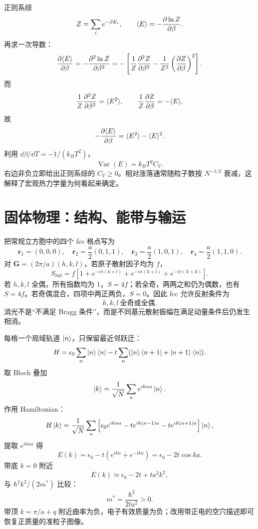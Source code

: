 \begin{examplebox}[title=例 12：由能量涨落推出正则系综热容]
正则系综
\[
Z=\sum_i e^{-\beta E_i},\qquad
\langle E\rangle=-\frac{\partial \ln Z}{\partial \beta}.
\]
再求一次导数：
\[
\frac{\partial \langle E\rangle}{\partial \beta}
=-\frac{\partial^2\ln Z}{\partial\beta^2}
=-\left[
\frac1Z\frac{\partial^2 Z}{\partial\beta^2}
-\frac1{Z^2}\left(\frac{\partial Z}{\partial \beta}\right)^2
\right].
\]
而
\[
\frac1Z\frac{\partial^2 Z}{\partial\beta^2}=\langle E^2\rangle,\qquad
\frac1Z\frac{\partial Z}{\partial \beta}=-\langle E\rangle,
\]
故
\[
-\frac{\partial \langle E\rangle}{\partial \beta}
=\langle E^2\rangle-\langle E\rangle^2.
\]
利用 $\dd\beta/\dd T=-1/(k_BT^2)$，
\[
\boxed{\operatorname{Var}(E)
=k_BT^2C_V}.
\]
右边非负立即给出正则系综的 $C_V\ge0$。相对涨落通常随粒子数按 $N^{-1/2}$ 衰减，这解释了宏观热力学量为何看起来确定。
\end{examplebox}

\section{固体物理：结构、能带与输运}

\begin{examplebox}[title=例 13：fcc 单原子结构因子与允许反射]
把常规立方胞中的四个 fcc 格点写为
\[
\bm r_1=(0,0,0),\quad
\bm r_2=\frac a2(0,1,1),\quad
\bm r_3=\frac a2(1,0,1),\quad
\bm r_4=\frac a2(1,1,0).
\]
对 $\bm G=(2\pi/a)(h,k,l)$，若原子散射因子均为 $f$，
\[
S_{hkl}=f\left[
1+e^{-i\pi(k+l)}+e^{-i\pi(h+l)}+e^{-i\pi(h+k)}
\right].
\]
若 $h,k,l$ 全偶，所有指数均为 $1$，$S=4f$；若全奇，两两之和仍为偶数，也有 $S=4f$。若奇偶混合，四项中两正两负，$S=0$。因此 fcc 允许反射条件为
\[
\boxed{h,k,l\ \text{全奇或全偶}}.
\]
消光不是“不满足 Bragg 条件”，而是不同基元散射振幅在满足动量条件后仍发生相消。
\end{examplebox}

\begin{examplebox}[title=例 14：一维紧束缚链的能带和有效质量]
每格一个局域轨道 $\left|n\right\rangle$，只保留最近邻跃迁：
\[
H=\epsilon_0\sum_n\left|n\right\rangle\left\langle n\right|
-t\sum_n(\left|n\right\rangle\left\langle n+1\right|+\left|n+1\right\rangle\left\langle n\right|).
\]
取 Bloch 叠加
\[
\left|k\right\rangle=\frac1{\sqrt N}\sum_ne^{ikna}\left|n\right\rangle.
\]
作用 Hamiltonian：
\[
H\left|k\right\rangle
=\frac1{\sqrt N}\sum_n
\left[\epsilon_0e^{ikna}-t e^{ik(n-1)a}-t e^{ik(n+1)a}\right]\left|n\right\rangle,
\]
提取 $e^{ikna}$ 得
\[
E(k)=\epsilon_0-t(e^{ika}+e^{-ika})
=\epsilon_0-2t\cos ka.
\]
带底 $k=0$ 附近
\[
E(k)\simeq\epsilon_0-2t+ta^2k^2,
\]
与 $\hbar^2k^2/(2m^*)$ 比较：
\[
m^*=\frac{\hbar^2}{2ta^2}>0.
\]
带顶 $k=\pi/a+q$ 附近曲率为负，电子有效质量为负；改用带正电的空穴描述即可恢复正质量的准粒子图像。
\end{examplebox}

